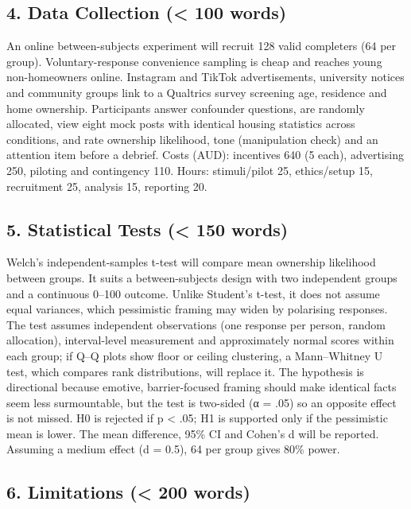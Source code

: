 \documentclass[
]{article}
\begin{document}
\hypertarget{data-collection-100-words}{%
\subsection{4. Data Collection (\textless{} 100
words)}\label{data-collection-100-words}}

An online between-subjects experiment will recruit 128 valid completers
(64 per group). Voluntary-response convenience sampling is cheap and
reaches young non-homeowners online. Instagram and TikTok
advertisements, university notices and community groups link to a
Qualtrics survey screening age, residence and home ownership.
Participants answer confounder questions, are randomly allocated, view
eight mock posts with identical housing statistics across conditions,
and rate ownership likelihood, tone (manipulation check) and an
attention item before a debrief. Costs (AUD): incentives 640 (5 each),
advertising 250, piloting and contingency 110. Hours: stimuli/pilot 25,
ethics/setup 15, recruitment 25, analysis 15, reporting 20.

\hypertarget{statistical-tests-150-words}{%
\subsection{5. Statistical Tests (\textless{} 150
words)}\label{statistical-tests-150-words}}

Welch's independent-samples t-test will compare mean ownership
likelihood between groups. It suits a between-subjects design with two
independent groups and a continuous 0--100 outcome. Unlike Student's
t-test, it does not assume equal variances, which pessimistic framing
may widen by polarising responses. The test assumes independent
observations (one response per person, random allocation),
interval-level measurement and approximately normal scores within each
group; if Q--Q plots show floor or ceiling clustering, a Mann--Whitney U
test, which compares rank distributions, will replace it. The hypothesis
is directional because emotive, barrier-focused framing should make
identical facts seem less surmountable, but the test is two-sided (α =
.05) so an opposite effect is not missed. H0 is rejected if p
\textless{} .05; H1 is supported only if the pessimistic mean is lower.
The mean difference, 95\% CI and Cohen's d will be reported. Assuming a
medium effect (d = 0.5), 64 per group gives 80\% power.

\hypertarget{limitations-200-words}{%
\subsection{6. Limitations (\textless{} 200
words)}\label{limitations-200-words}}
\end{document}
